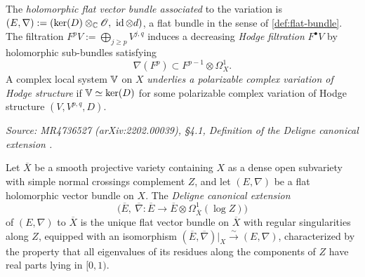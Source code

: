 \begin{definition}
  The \emph{holomorphic flat vector bundle associated} to the variation is
  \((E, \nabla) := (\ker(D) \otimes_{\mathbb{C}} \mathscr{O},\ \operatorname{id} \otimes d)\), a flat bundle in
  the sense of \cref{def:flat-bundle}. The filtration \(F^p V := \bigoplus_{j \geq p}
  V^{j,q}\) induces a decreasing \emph{Hodge filtration} \(F^\bullet V\) by
  holomorphic sub-bundles satisfying
  \begin{equation}\label{eqn:griffiths-transversality}
    \nabla(F^p) \subset F^{p-1} \otimes \Omega^1_X.
  \end{equation}
  A complex local system \(\mathbb{V}\) on \(X\) \emph{underlies a polarizable complex
  variation of Hodge structure} if \(\mathbb{V} \simeq \ker(D)\) for some polarizable
  complex variation of Hodge structure \((V, V^{p,q}, D)\).
\end{definition}

\begin{definition}
  \label{def:deligne-canonical-extension}
  \textit{Source: MR4736527 (arXiv:2202.00039), §4.1, Definition of the Deligne
  canonical extension \cite[Remarques 5.5(i)]{deligne:regular-singular}.}

  Let \(\overline{X}\) be a smooth projective variety containing \(X\) as a dense
  open subvariety with simple normal crossings complement \(Z\), and let
  \((E, \nabla)\) be a flat holomorphic vector bundle on \(X\). The \emph{Deligne
  canonical extension}
  \[
    \bigl(\overline{E},\ \overline{\nabla} : \overline{E} \to
    \overline{E} \otimes \Omega^1_{\overline{X}}(\log Z)\bigr)
  \]
  of \((E, \nabla)\) to \(\overline{X}\) is the unique flat vector bundle on
  \(\overline{X}\) with regular singularities along \(Z\), equipped with an
  isomorphism \((\overline{E}, \overline{\nabla})|_X \xrightarrow{\sim} (E,
  \nabla)\), characterized by the property that all eigenvalues of its residues
  along the components of \(Z\) have real parts lying in \([0,1)\).
\end{definition}

